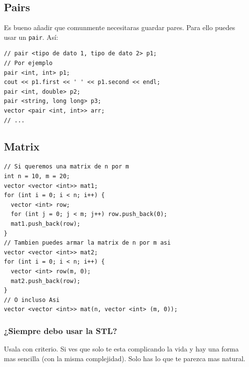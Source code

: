 \documentclass[a4paper,12pt]{article}
\begin{document}
\subsection*{Pairs}
Es bueno añadir que comunmente necesitaras guardar pares. Para ello puedes usar un \texttt{pair}. Así:
\begin{lstlisting}
// pair <tipo de dato 1, tipo de dato 2> p1;
// Por ejemplo
pair <int, int> p1;
cout << p1.first << ' ' << p1.second << endl;
pair <int, double> p2;
pair <string, long long> p3;
vector <pair <int, int>> arr;
// ...
\end{lstlisting}
\subsection*{Matrix}
\begin{lstlisting}
// Si queremos una matrix de n por m
int n = 10, m = 20;
vector <vector <int>> mat1;
for (int i = 0; i < n; i++) {
  vector <int> row;
  for (int j = 0; j < m; j++) row.push_back(0);
  mat1.push_back(row);
}
// Tambien puedes armar la matrix de n por m asi
vector <vector <int>> mat2;
for (int i = 0; i < n; i++) {
  vector <int> row(m, 0);
  mat2.push_back(row);
}
// O incluso Asi
vector <vector <int>> mat(n, vector <int> (m, 0));
\end{lstlisting}
\subsubsection*{¿Siempre debo usar la STL?}
Usala con criterio. Si ves que solo te esta complicando la vida y hay una forma mas sencilla (con la misma complejidad). Solo has lo que te parezca mas natural.
\end{document}
